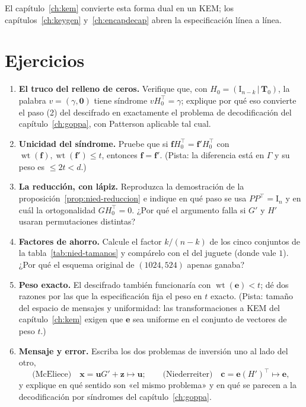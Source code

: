 \documentclass[11pt,a4paper,oneside]{report}
\newcommand{\wt}{\operatorname{wt}}
\newcommand{\Tmat}{\mathbf{T}}          %
\newcommand{\ve}{\mathbf{e}}
\newcommand{\vx}{\mathbf{x}}
\newcommand{\vc}{\mathbf{c}}
\newcommand{\vu}{\mathbf{u}}
\newcommand{\vz}{\mathbf{z}}
\newcommand{\vf}{\mathbf{f}}
\begin{document}
\noindent El capítulo~\ref{ch:kem} convierte esta forma dual en un KEM;
los capítulos~\ref{ch:keygen} y~\ref{ch:encapdecap} abren la
especificación línea a línea.

\section{Ejercicios}

\begin{enumerate}[leftmargin=1.6em,itemsep=4pt]
  \item \textbf{El truco del relleno de ceros.} Verifique que, con
        $H_0=(\mathrm{I}_{n-k}\,|\,\Tmat_0)$, la palabra
        $v=(\gamma,\mathbf{0})$ tiene síndrome
        $vH_0^{\top}=\gamma$; explique por qué eso convierte el paso
        (2) del descifrado en exactamente el problema de decodificación
        del capítulo~\ref{ch:goppa}, con Patterson aplicable tal cual.
  \item \textbf{Unicidad del síndrome.} Pruebe que si
        $\vf H_0^{\top}=\vf' H_0^{\top}$ con
        $\wt(\vf),\wt(\vf')\le t$, entonces $\vf=\vf'$. (Pista: la
        diferencia está en $\Gamma$ y su peso es $\le2t<d$.)
  \item \textbf{La reducción, con lápiz.} Reproduzca la demostración de
        la proposición~\ref{prop:nied-reduccion} e indique en qué paso
        se usa $PP^{\top}=\mathrm{I}_n$ y en cuál la ortogonalidad
        $GH_0^{\top}=0$. ¿Por qué el argumento falla si $G'$ y $H'$
        usaran permutaciones distintas?
  \item \textbf{Factores de ahorro.} Calcule el factor $k/(n-k)$ de los
        cinco conjuntos de la tabla~\ref{tab:nied-tamanos} y compárelo
        con el del juguete (donde vale $1$). ¿Por qué el esquema
        original de $(1024,524)$ apenas ganaba?
  \item \textbf{Peso exacto.} El descifrado también funcionaría con
        $\wt(\ve)<t$; dé dos razones por las que la especificación fija
        el peso en $t$ exacto. (Pista: tamaño del espacio de mensajes y
        uniformidad: las transformaciones a KEM del
        capítulo~\ref{ch:kem} exigen que $\ve$ sea uniforme en el
        conjunto de vectores de peso $t$.)
  \item \textbf{Mensaje y error.} Escriba los dos problemas de inversión
        uno al lado del otro,
        \[
          \text{(McEliece)}\quad \vx=\vu G'+\vz\mapsto \vu ;
          \qquad
          \text{(Niederreiter)}\quad \vc=\ve(H')^{\top}\mapsto \ve ,
        \]
        y explique en qué sentido son «el mismo problema» y en qué se
        parecen a la decodificación por síndromes del
        capítulo~\ref{ch:goppa}.
\end{enumerate}
\end{document}
